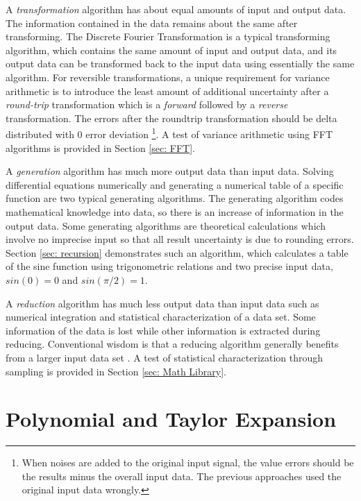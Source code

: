 \documentclass[twoside]{article}
\numberwithin{equation}{section}
\begin{document}
A \emph{transformation} algorithm has about equal amounts of input and output data.  
The information contained in the data remains about the same after transforming.  
The Discrete Fourier Transformation is a typical transforming algorithm, which contains the same amount of input and output data, and its output data can be transformed back to the input data using essentially the same algorithm.  
For reversible transformations, a unique requirement for variance arithmetic is to introduce the least amount of additional uncertainty after a \emph{round-trip} transformation which is a \emph{forward} followed by a \emph{reverse} transformation.  
The errors after the roundtrip transformation should be delta distributed with $0$ error deviation \footnote{When noises are added to the original input signal, the value errors should be the results minus the overall input data. The previous approaches \cite{Prev_Precision_Arithmetic} used the original input data wrongly.}.
A test of variance arithmetic using FFT algorithms is provided in Section \ref{sec: FFT}.

A \emph{generation} algorithm has much more output data than input data.  
Solving differential equations numerically and generating a numerical table of a specific function are two typical generating algorithms.  
The generating algorithm codes mathematical knowledge into data, so there is an increase of information in the output data.  
Some generating algorithms are theoretical calculations which involve no imprecise input so that all result uncertainty is due to rounding errors.  
Section \ref{sec: recursion} demonstrates such an algorithm, which calculates a table of the sine function using trigonometric relations and two precise input data, $sin(0)=0$ and $sin(\pi/2)=1$.  

A \emph{reduction} algorithm has much less output data than input data such as numerical integration and statistical characterization of a data set.  
Some information of the data is lost while other information is extracted during reducing.  
Conventional wisdom is that a reducing algorithm generally benefits from a larger input data set \cite{Probability_Statistics}.  
A test of statistical characterization through sampling is provided in Section \ref{sec: Math Library}.



\clearpage
\section{Polynomial and Taylor Expansion}
\label{sec: polynomial}
\end{document}
